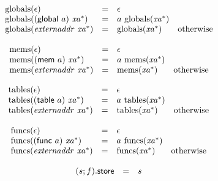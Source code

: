 $$
\begin{array}[t]{@{}lcl@{}l@{}}
{\mathrm{globals}}(\epsilon) & = & \epsilon \\
{\mathrm{globals}}((\mathsf{global}~a)~{{\mathit{xa}}^\ast}) & = & a~{\mathrm{globals}}({{\mathit{xa}}^\ast}) \\
{\mathrm{globals}}({\mathit{externaddr}}~{{\mathit{xa}}^\ast}) & = & {\mathrm{globals}}({{\mathit{xa}}^\ast}) & \quad \mbox{otherwise} \\
\end{array}
$$

$$
\begin{array}[t]{@{}lcl@{}l@{}}
{\mathrm{mems}}(\epsilon) & = & \epsilon \\
{\mathrm{mems}}((\mathsf{mem}~a)~{{\mathit{xa}}^\ast}) & = & a~{\mathrm{mems}}({{\mathit{xa}}^\ast}) \\
{\mathrm{mems}}({\mathit{externaddr}}~{{\mathit{xa}}^\ast}) & = & {\mathrm{mems}}({{\mathit{xa}}^\ast}) & \quad \mbox{otherwise} \\
\end{array}
$$

$$
\begin{array}[t]{@{}lcl@{}l@{}}
{\mathrm{tables}}(\epsilon) & = & \epsilon \\
{\mathrm{tables}}((\mathsf{table}~a)~{{\mathit{xa}}^\ast}) & = & a~{\mathrm{tables}}({{\mathit{xa}}^\ast}) \\
{\mathrm{tables}}({\mathit{externaddr}}~{{\mathit{xa}}^\ast}) & = & {\mathrm{tables}}({{\mathit{xa}}^\ast}) & \quad \mbox{otherwise} \\
\end{array}
$$

$$
\begin{array}[t]{@{}lcl@{}l@{}}
{\mathrm{funcs}}(\epsilon) & = & \epsilon \\
{\mathrm{funcs}}((\mathsf{func}~a)~{{\mathit{xa}}^\ast}) & = & a~{\mathrm{funcs}}({{\mathit{xa}}^\ast}) \\
{\mathrm{funcs}}({\mathit{externaddr}}~{{\mathit{xa}}^\ast}) & = & {\mathrm{funcs}}({{\mathit{xa}}^\ast}) & \quad \mbox{otherwise} \\
\end{array}
$$

\vspace{1ex}

$$
\begin{array}[t]{@{}lcl@{}l@{}}
(s ; f){.}\mathsf{store} & = & s \\
\end{array}
$$

